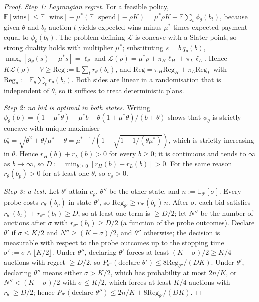 \documentclass[11pt]{article}
\theoremstyle{definition}
\theoremstyle{remark}
\newcommand{\E}{\mathbb{E}}
\begin{document}
\begin{proof}
\emph{Step 1: Lagrangian regret.} For a feasible policy, $\E[\text{wins}]\le\E[\text{wins}]-\mu^*(\E[\text{spend}]-\rho K)
=\mu^*\rho K+\E\sum_t\phi_\theta(b_t)$, because given $\theta$ and $b_t$ auction $t$ yields expected wins minus $\mu^*$ times
expected payment equal to $\phi_\theta(b_t)$. The problem defining $\mathcal L$ is concave with a Slater point, so strong
duality holds with multiplier $\mu^*$; substituting $s=b\,q_\theta(b)$, $\max_s[g_\theta(s)-\mu^*s]=\ell_\theta$ and
$\mathcal L(\rho)=\mu^*\rho+\pi_H\ell_H+\pi_L\ell_L$. Hence $K\mathcal L(\rho)-V\ge\mathrm{Reg}:=\E\sum_tr_\theta(b_t)$, and
$\mathrm{Reg}=\pi_H\mathrm{Reg}_H+\pi_L\mathrm{Reg}_L$ with $\mathrm{Reg}_\theta:=\E_\theta\sum_tr_\theta(b_t)$. Both sides are linear in a
randomisation that is independent of $\theta$, so it suffices to treat deterministic plans.

\emph{Step 2: no bid is optimal in both states.} Writing
$\phi_\theta(b)=(1+\mu^*\theta)-\mu^*b-\theta(1+\mu^*\theta)/(b+\theta)$ shows that $\phi_\theta$ is strictly concave with unique
maximiser $b^\star_\theta=\sqrt{\theta^2+\theta/\mu^*}-\theta=\mu^{*-1}/(1+\sqrt{1+1/(\theta\mu^*)})$, which is strictly increasing in
$\theta$. Hence $r_H(b)+r_L(b)>0$ for every $b\ge0$; it is continuous and tends to $\infty$ as $b\to\infty$, so
$D:=\min_{b\ge0}[r_H(b)+r_L(b)]>0$. For the same reason $r_\theta(b_p)>0$ for at least one $\theta$, so $c_\rho>0$.

\emph{Step 3: a test.} Let $\theta'$ attain $c_\rho$, $\theta''$ be the other state, and $n:=\E_{\theta'}[\sigma]$. Every probe costs
$r_{\theta'}(b_p)$ in state $\theta'$, so $\mathrm{Reg}_{\theta'}\ge r_{\theta'}(b_p)\,n$. After $\sigma$, each bid satisfies
$r_{\theta'}(b_t)+r_{\theta''}(b_t)\ge D$, so at least one term is $\ge D/2$; let $N''$ be the number of auctions after $\sigma$
with $r_{\theta''}(b_t)\ge D/2$ (a function of the probe outcomes). Declare $\theta'$ if $\sigma\le K/2$ and
$N''\ge(K-\sigma)/2$, and $\theta''$ otherwise; the decision is measurable with respect to the probe outcomes up to the
stopping time $\sigma':=\sigma\wedge\lfloor K/2\rfloor$. Under $\theta''$, declaring $\theta'$ forces at least
$(K-\sigma)/2\ge K/4$ auctions with regret $\ge D/2$, so $P_{\theta''}(\text{declare }\theta')\le8\mathrm{Reg}_{\theta''}/(DK)$.
Under $\theta'$, declaring $\theta''$ means either $\sigma>K/2$, which has probability at most $2n/K$, or
$N''<(K-\sigma)/2$ with $\sigma\le K/2$, which forces at least $K/4$ auctions with $r_{\theta'}\ge D/2$; hence
$P_{\theta'}(\text{declare }\theta'')\le2n/K+8\mathrm{Reg}_{\theta'}/(DK)$.


\end{proof}
\end{document}
